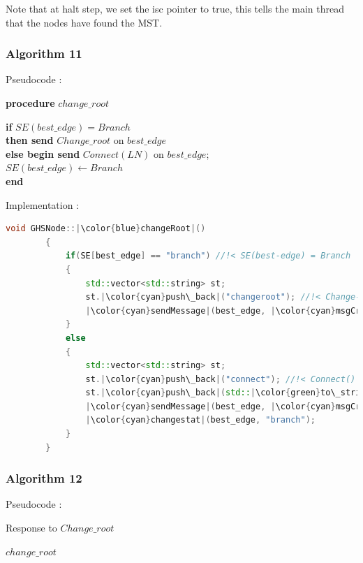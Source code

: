 \documentclass[letterpaper,11pt]{article}
\begin{document}
	Note that at halt step, we set the isc pointer to true, this tells the main thread that the nodes have found the MST.
	
	\subsubsection{Algorithm 11}
	Pseudocode : \\
	
	\begin{tcolorbox}
		{\bf procedure} $change\_root$
		\begin{algorithmic}
			\STATE \textbf{if} $SE(best\_edge) = Branch$ \\
			{\qquad \bf then send} $Change\_root$ on $best\_edge$ \\
			{\quad \bf else begin send} $Connect(LN)$ on $best\_edge$; \\
			{\qquad \qquad \qquad} $SE(best\_edge) \leftarrow Branch$ \\
			{\qquad \qquad \bf end}
		\end{algorithmic}
	\end{tcolorbox}
	
	\bigskip 
	
	Implementation : 
	
	
	\begin{lstlisting}[language=C++, caption= changeRoot()]
		void GHSNode::|\color{blue}changeRoot|()
		{
			if(SE[best_edge] == "branch") //!< SE(best-edge) = Branch
			{
				std::vector<std::string> st;
				st.|\color{cyan}push\_back|("changeroot"); //!< Change-root()
				|\color{cyan}sendMessage|(best_edge, |\color{cyan}msgCreater|(st)); //!< send Change-root() on best-edge
			}
			else
			{
				std::vector<std::string> st;
				st.|\color{cyan}push\_back|("connect"); //!< Connect()
				st.|\color{cyan}push\_back|(std::|\color{green}to\_string|(LN)); //!< LN
				|\color{cyan}sendMessage|(best_edge, |\color{cyan}msgCreater|(st)); //!< send Connect(LN) on best-edge
				|\color{cyan}changestat|(best_edge, "branch");
			}
		}
	\end{lstlisting}

	
	\subsubsection{Algorithm 12}
	Pseudocode : \\
	
	\begin{tcolorbox}
		Response to $Change\_root$
		\begin{algorithmic}
			 $change\_root$
		\end{algorithmic}
	\end{tcolorbox}
	
\end{document}
